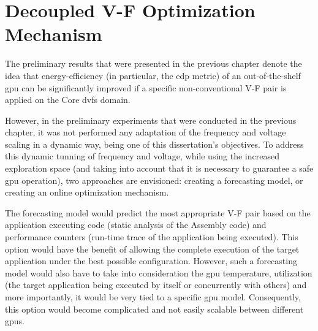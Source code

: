 
\chapter{Decoupled V-F Optimization Mechanism}
\label{chapter:mech}


The preliminary results that were presented in the previous chapter denote the idea that energy-efficiency (in particular, the \acrshort{edp} metric) of an out-of-the-shelf \acrshort{gpu} can be significantly improved if a specific non-conventional V-F pair is applied on the Core \acrshort{dvfs} domain. 

However, in the preliminary experiments that were conducted in the previous chapter, it was not performed any adaptation of the frequency and voltage scaling in a dynamic way, being one of this dissertation's objectives.
To address this dynamic tunning of frequency and voltage, while using the increased exploration space (and taking into account that it is necessary to guarantee a safe \acrshort{gpu} operation), two approaches are envisioned: creating a forecasting model, or creating an online optimization mechanism.

The forecasting model would predict the most appropriate V-F pair based on the application executing code (static analysis of the Assembly code) and performance counters (run-time trace of the application being executed). This option would have the benefit of allowing the complete execution of the target application under the best possible configuration. However, such a forecasting model would also have to take into consideration the \acrshort{gpu} temperature, utilization (the target application being executed by itself or concurrently with others) and more importantly, it would be very tied to a specific \acrshort{gpu} model. Consequently, this option would become complicated and not easily scalable between different \acrshort{gpu}s.

